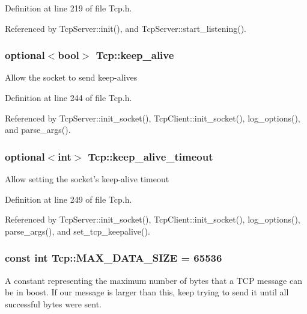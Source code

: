 Definition at line 219 of file Tcp.h.



Referenced by TcpServer::init(), and TcpServer::start\_\-listening().

\hypertarget{classTcp_a5cec5af76ec94551f8dc5f98639e9953}{
\subsubsection[{keep\_\-alive}]{\setlength{\rightskip}{0pt plus 5cm}optional$<$bool$>$ {\bf Tcp::keep\_\-alive}}}
\label{classTcp_a5cec5af76ec94551f8dc5f98639e9953}
Allow the socket to send keep-\/alives 

Definition at line 244 of file Tcp.h.



Referenced by TcpServer::init\_\-socket(), TcpClient::init\_\-socket(), log\_\-options(), and parse\_\-args().

\hypertarget{classTcp_a08e171f501f01c117f5a3c04d394d137}{
\subsubsection[{keep\_\-alive\_\-timeout}]{\setlength{\rightskip}{0pt plus 5cm}optional$<$int$>$ {\bf Tcp::keep\_\-alive\_\-timeout}}}
\label{classTcp_a08e171f501f01c117f5a3c04d394d137}
Allow setting the socket's keep-\/alive timeout 

Definition at line 249 of file Tcp.h.



Referenced by TcpServer::init\_\-socket(), TcpClient::init\_\-socket(), log\_\-options(), parse\_\-args(), and set\_\-tcp\_\-keepalive().

\hypertarget{classTcp_a169a3d26315c2b5eecc02354ef44b777}{
\subsubsection[{MAX\_\-DATA\_\-SIZE}]{\setlength{\rightskip}{0pt plus 5cm}const int {\bf Tcp::MAX\_\-DATA\_\-SIZE} = 65536}}
\label{classTcp_a169a3d26315c2b5eecc02354ef44b777}
A constant representing the maximum number of bytes that a TCP message can be in boost. If our message is larger than this, keep trying to send it until all successful bytes were sent. 

